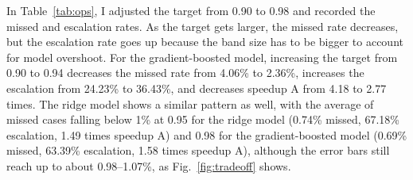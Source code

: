 \documentclass[12pt]{article}
\begin{document}
In Table~\ref{tab:ops}, I adjusted the target from 0.90 to 0.98 and recorded the missed and escalation rates. As the target gets larger, the missed rate decreases, but the escalation rate goes up because the band size has to be bigger to account for model overshoot. For the gradient-boosted model, increasing the target from 0.90 to 0.94 decreases the missed rate from 4.06\% to 2.36\%, increases the escalation from 24.23\% to 36.43\%, and decreases speedup A from 4.18 to 2.77 times. The ridge model shows a similar pattern as well, with the average of missed cases falling below 1\% at 0.95 for the ridge model (0.74\% missed, 67.18\% escalation, 1.49 times speedup A) and 0.98 for the gradient-boosted model (0.69\% missed, 63.39\% escalation, 1.58 times speedup A), although the error bars still reach up to about 0.98--1.07\%, as Fig.~\ref{fig:tradeoff} shows.
\end{document}
